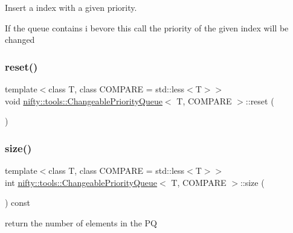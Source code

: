 Insert a index with a given priority. 

If the queue contains i bevore this call the priority of the given index will be changed \mbox{\label{classnifty_1_1tools_1_1ChangeablePriorityQueue_a544ad33d36c8c3884951b048c9fae0d7}} 
\subsubsection{\texorpdfstring{reset()}{reset()}}
{\footnotesize\ttfamily template$<$class T, class C\+O\+M\+P\+A\+RE = std\+::less$<$\+T$>$$>$ \\
void \hyperlink{classnifty_1_1tools_1_1ChangeablePriorityQueue}{nifty\+::tools\+::\+Changeable\+Priority\+Queue}$<$ T, C\+O\+M\+P\+A\+RE $>$\+::reset (\begin{DoxyParamCaption}{ }\end{DoxyParamCaption})\hspace{0.3cm}{\ttfamily [inline]}}

\mbox{\label{classnifty_1_1tools_1_1ChangeablePriorityQueue_adbb917b18a8bec3c379dfa742a9aacfd}} 
\subsubsection{\texorpdfstring{size()}{size()}}
{\footnotesize\ttfamily template$<$class T, class C\+O\+M\+P\+A\+RE = std\+::less$<$\+T$>$$>$ \\
int \hyperlink{classnifty_1_1tools_1_1ChangeablePriorityQueue}{nifty\+::tools\+::\+Changeable\+Priority\+Queue}$<$ T, C\+O\+M\+P\+A\+RE $>$\+::size (\begin{DoxyParamCaption}{ }\end{DoxyParamCaption}) const\hspace{0.3cm}{\ttfamily [inline]}}



return the number of elements in the PQ 

